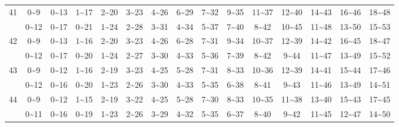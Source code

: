 \documentclass[lang=cn,10pt]{elegantbook}
\begin{document}
\begin{longtable}{c|cccccccccccccc}
    41 & 0\textasciitilde9 & 0\textasciitilde13 & 1\textasciitilde17 & 2\textasciitilde20 & 3\textasciitilde23 & 4\textasciitilde26 & 6\textasciitilde29 & 7\textasciitilde32 & 9\textasciitilde35 & 11\textasciitilde37 & 12\textasciitilde40 & 14\textasciitilde43 & 16\textasciitilde46 & 18\textasciitilde48 \\
       & 0\textasciitilde12 & 0\textasciitilde17 & 0\textasciitilde21 & 1\textasciitilde24 & 2\textasciitilde28 & 3\textasciitilde31 & 4\textasciitilde34 & 5\textasciitilde37 & 7\textasciitilde40 & 8\textasciitilde42 & 10\textasciitilde45 & 11\textasciitilde48 & 13\textasciitilde50 & 15\textasciitilde53 \\
    42 & 0\textasciitilde9 & 0\textasciitilde13 & 1\textasciitilde16 & 2\textasciitilde20 & 3\textasciitilde23 & 4\textasciitilde26 & 6\textasciitilde28 & 7\textasciitilde31 & 9\textasciitilde34 & 10\textasciitilde37 & 12\textasciitilde39 & 14\textasciitilde42 & 16\textasciitilde45 & 18\textasciitilde47 \\
       & 0\textasciitilde12 & 0\textasciitilde17 & 0\textasciitilde20 & 1\textasciitilde24 & 2\textasciitilde27 & 3\textasciitilde30 & 4\textasciitilde33 & 5\textasciitilde36 & 7\textasciitilde39 & 8\textasciitilde42 & 9\textasciitilde44 & 11\textasciitilde47 & 13\textasciitilde49 & 15\textasciitilde52 \\
    43 & 0\textasciitilde9 & 0\textasciitilde12 & 1\textasciitilde16 & 2\textasciitilde19 & 3\textasciitilde23 & 4\textasciitilde25 & 5\textasciitilde28 & 7\textasciitilde31 & 8\textasciitilde33 & 10\textasciitilde36 & 12\textasciitilde39 & 14\textasciitilde41 & 15\textasciitilde44 & 17\textasciitilde46 \\
       & 0\textasciitilde12 & 0\textasciitilde16 & 0\textasciitilde20 & 1\textasciitilde23 & 2\textasciitilde26 & 3\textasciitilde30 & 4\textasciitilde33 & 5\textasciitilde35 & 6\textasciitilde38 & 8\textasciitilde41 & 9\textasciitilde43 & 11\textasciitilde46 & 13\textasciitilde49 & 14\textasciitilde51 \\
    44 & 0\textasciitilde9 & 0\textasciitilde12 & 1\textasciitilde15 & 2\textasciitilde19 & 3\textasciitilde22 & 4\textasciitilde25 & 5\textasciitilde28 & 7\textasciitilde30 & 8\textasciitilde33 & 10\textasciitilde35 & 11\textasciitilde38 & 13\textasciitilde40 & 15\textasciitilde43 & 17\textasciitilde45 \\
       & 0\textasciitilde11 & 0\textasciitilde16 & 0\textasciitilde19 & 1\textasciitilde23 & 2\textasciitilde26 & 3\textasciitilde29 & 4\textasciitilde32 & 5\textasciitilde35 & 6\textasciitilde37 & 8\textasciitilde40 & 9\textasciitilde42 & 11\textasciitilde45 & 12\textasciitilde47 & 14\textasciitilde50 \\

\end{longtable}
\end{document}

